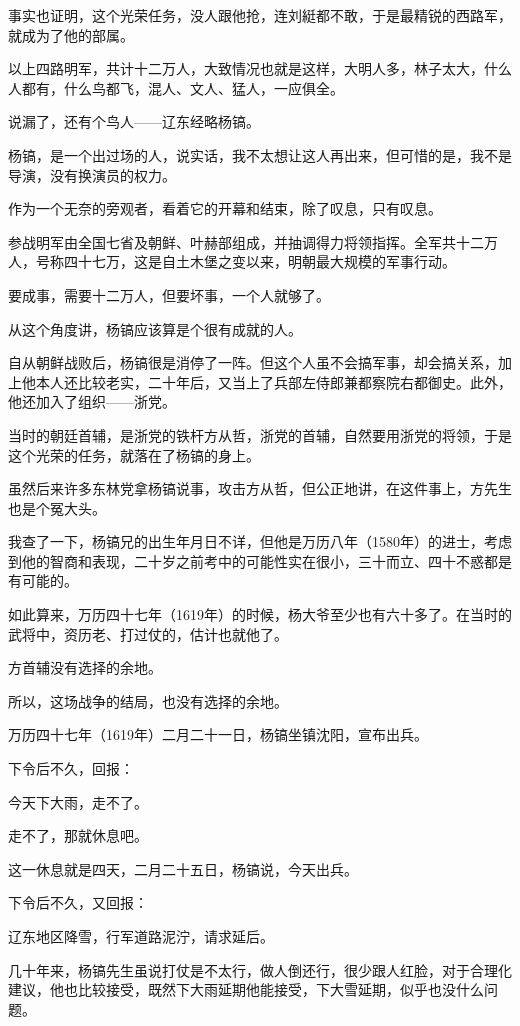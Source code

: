 \begin{multicols}{\theparacolNo}
事实也证明，这个光荣任务，没人跟他抢，连刘綎都不敢，于是最精锐的西路军，就成为了他的部属。

以上四路明军，共计十二万人，大致情况也就是这样，大明人多，林子太大，什么人都有，什么鸟都飞，混人、文人、猛人，一应俱全。

说漏了，还有个鸟人——辽东经略杨镐。

杨镐，是一个出过场的人，说实话，我不太想让这人再出来，但可惜的是，我不是导演，没有换演员的权力。

作为一个无奈的旁观者，看着它的开幕和结束，除了叹息，只有叹息。

参战明军由全国七省及朝鲜、叶赫部组成，并抽调得力将领指挥。全军共十二万人，号称四十七万，这是自土木堡之变以来，明朝最大规模的军事行动。

要成事，需要十二万人，但要坏事，一个人就够了。

从这个角度讲，杨镐应该算是个很有成就的人。

自从朝鲜战败后，杨镐很是消停了一阵。但这个人虽不会搞军事，却会搞关系，加上他本人还比较老实，二十年后，又当上了兵部左侍郎兼都察院右都御史。此外，他还加入了组织——浙党。

当时的朝廷首辅，是浙党的铁杆方从哲，浙党的首辅，自然要用浙党的将领，于是这个光荣的任务，就落在了杨镐的身上。

虽然后来许多东林党拿杨镐说事，攻击方从哲，但公正地讲，在这件事上，方先生也是个冤大头。

我查了一下，杨镐兄的出生年月日不详，但他是万历八年（1580年）的进士，考虑到他的智商和表现，二十岁之前考中的可能性实在很小，三十而立、四十不惑都是有可能的。

如此算来，万历四十七年（1619年）的时候，杨大爷至少也有六十多了。在当时的武将中，资历老、打过仗的，估计也就他了。

方首辅没有选择的余地。

所以，这场战争的结局，也没有选择的余地。

万历四十七年（1619年）二月二十一日，杨镐坐镇沈阳，宣布出兵。

下令后不久，回报：

今天下大雨，走不了。

走不了，那就休息吧。

这一休息就是四天，二月二十五日，杨镐说，今天出兵。

下令后不久，又回报：

辽东地区降雪，行军道路泥泞，请求延后。

几十年来，杨镐先生虽说打仗是不太行，做人倒还行，很少跟人红脸，对于合理化建议，他也比较接受，既然下大雨延期他能接受，下大雪延期，似乎也没什么问题。


\end{multicols}
